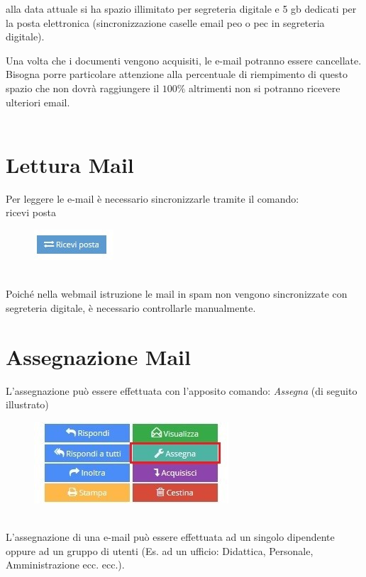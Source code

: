 \documentclass[a4paper,italian,12pt]{book}
\begin{document}
alla data attuale si ha spazio illimitato per segreteria digitale e 5 gb dedicati per la posta elettronica (sincronizzazione caselle email peo o pec in segreteria digitale).

Una volta che i documenti vengono acquisiti, le e-mail potranno essere cancellate.
Bisogna porre particolare attenzione alla percentuale di riempimento di questo spazio che non dovrà raggiungere il $100\%$ altrimenti non si potranno ricevere ulteriori email.
\\
\\
\section{Lettura Mail}
Per leggere le e-mail è necessario sincronizzarle tramite il comando: \\ricevi posta
\begin{figure}[ht]
\centering
\includegraphics[scale=1]{Figure/ric_posta.jpg} 
\end{figure} \\
Poiché nella webmail istruzione le mail in spam non vengono sincronizzate con segreteria digitale, è necessario controllarle manualmente.

\section{Assegnazione Mail}
L'assegnazione può essere effettuata con l'apposito comando: \textit{Assegna} (di seguito illustrato)
\begin{figure}[ht]
\centering
\includegraphics[scale=1]{Figure/ass_mail.jpg} 
\end{figure} \\
L'assegnazione di una e-mail può essere effettuata ad un singolo dipendente oppure ad un gruppo di utenti (Es. ad un ufficio: Didattica, Personale, Amministrazione ecc. ecc.).
\end{document}
